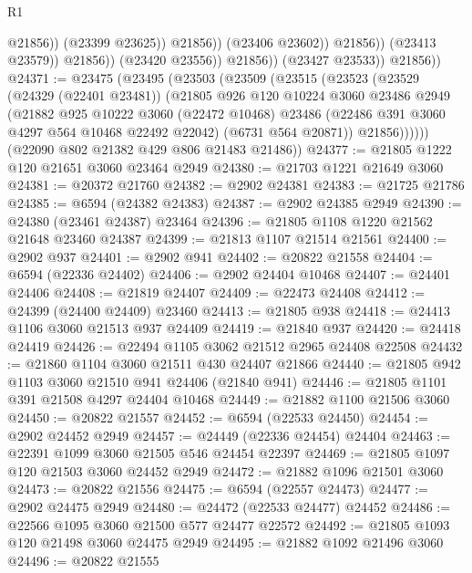 \begin{lexlean}{R1}
\begin{coremodule}
                                      @21856))
                                  (@23399 @23625))
                                @21856))
                            (@23406 @23602))
                          @21856))
                      (@23413 @23579))
                    @21856))
                (@23420 @23556))
              @21856))
          (@23427 @23533))
        @21856))
@24371 := @23475
    (@23495
      (@23503
        (@23509
          (@23515
            (@23523
              (@23529
                (@24329 (@22401 @23481))
                (@21805
                  @926
                  @120
                  @10224
                  @3060
                  @23486
                  @2949
                  (@21882
                    @925
                    @10222
                    @3060
                    (@22472 @10468)
                    @23486
                    (@22486 @391 @3060 @4297 @564 @10468 @22492 @22042)
                    (@6731 @564 @20871))
                  @21856))))))
      (@22090 @802 @21382 @429 @806 @21483 @21486))
@24377 := @21805 @1222 @120 @21651 @3060 @23464 @2949
@24380 := @21703 @1221 @21649 @3060
@24381 := @20372 @21760
@24382 := @2902 @24381
@24383 := @21725 @21786
@24385 := @6594 (@24382 @24383)
@24387 := @2902 @24385 @2949
@24390 := @24380 (@23461 @24387) @23464
@24396 := @21805 @1108 @1220 @21562 @21648 @23460 @24387
@24399 := @21813 @1107 @21514 @21561
@24400 := @2902 @937
@24401 := @2902 @941
@24402 := @20822 @21558
@24404 := @6594 (@22336 @24402)
@24406 := @2902 @24404 @10468
@24407 := @24401 @24406
@24408 := @21819 @24407
@24409 := @22473 @24408
@24412 := @24399 (@24400 @24409) @23460
@24413 := @21805 @938
@24418 := @24413 @1106 @3060 @21513 @937 @24409
@24419 := @21840 @937
@24420 := @24418 @24419
@24426 := @22494 @1105 @3062 @21512 @2965 @24408 @22508
@24432 := @21860 @1104 @3060 @21511 @430 @24407 @21866
@24440 := @21805 @942 @1103 @3060 @21510 @941 @24406 (@21840 @941)
@24446 := @21805 @1101 @391 @21508 @4297 @24404 @10468
@24449 := @21882 @1100 @21506 @3060
@24450 := @20822 @21557
@24452 := @6594 (@22533 @24450)
@24454 := @2902 @24452 @2949
@24457 := @24449 (@22336 @24454) @24404
@24463 := @22391 @1099 @3060 @21505 @546 @24454 @22397
@24469 := @21805 @1097 @120 @21503 @3060 @24452 @2949
@24472 := @21882 @1096 @21501 @3060
@24473 := @20822 @21556
@24475 := @6594 (@22557 @24473)
@24477 := @2902 @24475 @2949
@24480 := @24472 (@22533 @24477) @24452
@24486 := @22566 @1095 @3060 @21500 @577 @24477 @22572
@24492 := @21805 @1093 @120 @21498 @3060 @24475 @2949
@24495 := @21882 @1092 @21496 @3060
@24496 := @20822 @21555

\end{coremodule}
\end{lexlean}
